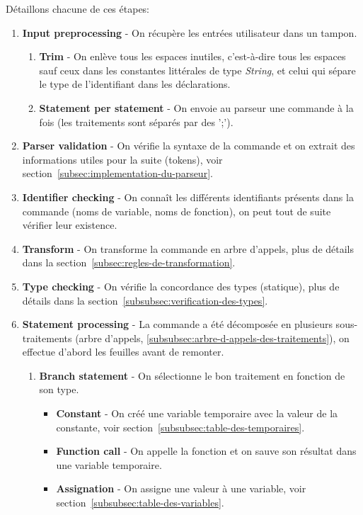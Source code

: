 \documentclass[french]{article}
\begin{document}
			Détaillons chacune de ces étapes:
			\begin{enumerate}
				\item \textbf{Input preprocessing} - On récupère les entrées utilisateur dans un tampon.
				\begin{enumerate}
					\item \textbf{Trim} - On enlève tous les espaces inutiles, c'est-à-dire tous les espaces sauf ceux dans les constantes littérales de type \textit{String}, et celui qui sépare le type de l'identifiant dans les déclarations.
					\item \textbf{Statement per statement} - On envoie au parseur une commande à la fois (les traitements sont séparés par des ';').
				\end{enumerate}
				\item \textbf{Parser validation} - On vérifie la syntaxe de la commande et on extrait des informations utiles pour la suite (tokens), voir section~\ref{subsec:implementation-du-parseur}.
				\item \textbf{Identifier checking} - On connaît les différents identifiants présents dans la commande (noms de variable, noms de fonction), on peut tout de suite vérifier leur existence.
				\item \textbf{Transform} - On transforme la commande en arbre d'appels, plus de détails dans la section~\ref{subsec:regles-de-transformation}.
				\item \textbf{Type checking} - On vérifie la concordance des types (statique), plus de détails dans la section~\ref{subsubsec:verification-des-types}.
				\item \textbf{Statement processing} - La commande a été décomposée en plusieurs sous-traitements (arbre d'appels, \ref{subsubsec:arbre-d-appels-des-traitements}), on effectue d'abord les feuilles avant de remonter.
				\begin{enumerate}
					\item \textbf{Branch statement} - On sélectionne le bon traitement en fonction de son type.
					\begin{itemize}
						\item \textbf{Constant} - On créé une variable temporaire avec la valeur de la constante, voir section~\ref{subsubsec:table-des-temporaires}.
						\item \textbf{Function call} - On appelle la fonction et on sauve son résultat dans une variable temporaire.
						\item \textbf{Assignation} - On assigne une valeur à une variable, voir section~\ref{subsubsec:table-des-variables}.

\end{itemize}
\end{enumerate}
\end{enumerate}
\end{document}
